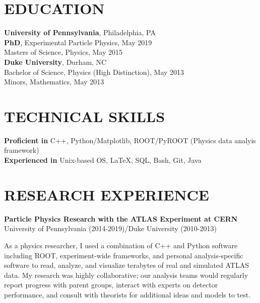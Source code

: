 \documentclass[10pt]{res}
\begin{document}
\begin{resume}

 
\section{EDUCATION}          
    {\bf University of Pennsylvania}, Philadelphia, PA \\
    {\bf PhD}, Experimental Particle Physics, May 2019 \\
    Masters of Science, Physics, May 2015 \\
    \newline
    {\bf Duke University}, Durham, NC \\        
    Bachelor of Science, Physics (High Distinction), May 2013   \\       
    Minors, Mathematics, May 2013 
 
\section{TECHNICAL SKILLS}
    {\bf Proficient in} C++, Python/Matplotlib, ROOT/PyROOT (Physics data analyis framework)\\
    {\bf Experienced in} Unix-based OS, \LaTeX, SQL, Bash, Git, Java %

\section{RESEARCH EXPERIENCE}%
    {\bf Particle Physics Research with the ATLAS Experiment at CERN}\\
    University of Pennsylvania (2014-2019)/Duke University (2010-2013)

    As a physics researcher, I used a combination of C++ and Python software including ROOT, experiment-wide frameworks, and personal analysis-specific software to read, analyze, and visualize terabytes of real and simulated ATLAS data.
    My research was highly collaborative; our analysis teams would regularly report progress with parent groups, interact with experts on detector performance, and consult with theorists for additional ideas and models to test.
    

\end{resume}
\end{document}
